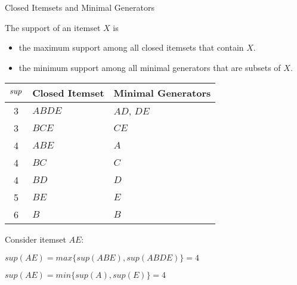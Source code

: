 \begin{frame}{Closed Itemsets and Minimal Generators}

The support of an itemset $X$ is

\begin{itemize}
\item the maximum support among all closed itemsets that contain $X$.

\item the minimum support among all minimal generators that are subsets of $X$.
\end{itemize}

\begin{center}
\begin{tabular}{|c|l|l|}
\hline
$\mathit{sup}$ & Closed Itemset & Minimal Generators \\ \hline
3 & $\mathit{ABDE}$ & $\mathit{AD}$, $\mathit{DE}$\\
3 & $\mathit{BCE}$ & $\mathit{CE}$\\
4 & $\mathit{ABE}$ & $A$\\
4 & $\mathit{BC}$ & $C$\\
4 & $\mathit{BD}$ & $D$\\
5 & $\mathit{BE}$ & $E$\\
6 & $B$ & $B$\\ \hline
\end{tabular}%
\end{center}

Consider itemset $AE$:
\medskip

	$sup(AE) = max\{sup(ABE),sup(ABDE)\} = 4$

	\medskip

	$sup(AE) = min\{sup(A),sup(E)\} = 4$

\end{frame}

\ifdefined\wox \begin{frame} \titlepage \end{frame} \fi

